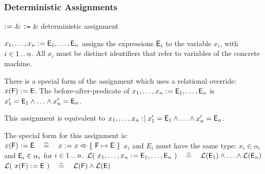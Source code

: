 \newcommand{\eventbassignmentexpr}[1]{\expre_{#1}(\allconstants,\concvariables,\concparameters)}

\begin{samepage}
\subsubsection{Deterministic Assignments}
\label{deterministic_assignments}

\begin{rrnames}
  $\mathrel{:\mkern1mu=}$ & \texttt{:=} & deterministic assignment
\end{rrnames}
\begin{rodinrefentry}
  \rrdesc
    $x_1,\ldots,x_n \mathrel{:\mkern1mu=} \textsf{E}_1,\ldots,\textsf{E}_n$
    assigns the expressions $\textsf{E}_i$ to the variable $x_i$, with $i\in1\mathbin{.\mkern1mu.} n$.
    All $x_i$ must be distinct identifiers that refer to variables of the concrete machine.

    There is a special form of the assignment which uses a relational override:\\
    $x(\textsf{F}) \mathrel{:\mkern1mu=} \textsf{E}$.
  \rrdef
    The before-after-predicate of $x_1,\ldots,x_n \mathrel{:\mkern1mu=} \textsf{E}_1,\ldots,\textsf{E}_n$ is\\ $x_1' = \textsf{E}_1 \land \ldots \land x_n' = \textsf{E}_n$.

    This assignment is equivalent to
    $x_1,\ldots,x_n \mathrel{:\mkern1mu\mid} x_1' = \textsf{E}_1 \land \ldots \land x_n' = \textsf{E}_n$.

    The special form for this assignment is:\\
    $x(\textsf{F}) \mathrel{:\mkern1mu=} \textsf{E}
      \quad\mathrel{\widehat=}\quad 
      x \mathrel{:\mkern1mu=} x \mathbin{\lhd\mkern-9mu-} \{~\textsf{F} \mapsto \textsf{E}~\}$
  \rrtypes
    $x_i$ and $E_i$ must have the same type:
    $x_i\in\alpha_i$ and  $\textsf{E}_i\in\alpha_i$ for $i \in 1\mathbin{.\mkern1mu.} n$.
  \rrwd
    $\mathcal{L}(~x_1,\ldots,x_n \mathrel{:\mkern1mu=} \textsf{E}_1,\ldots,\textsf{E}_n~)
      \quad\mathrel{\widehat=}\quad 
      \mathcal{L}(\textsf{E}_1) \land \ldots \land \mathcal{L}(\textsf{E}_n)$ \\
    $\mathcal{L}(~x(\textsf{F}) \mathrel{:\mkern1mu=} \textsf{E}~)
    \quad\mathrel{\widehat=}\quad 
    \mathcal{L}(\textsf{F}) \land \mathcal{L}(\textsf{E})$
\end{rodinrefentry}
\end{samepage}

